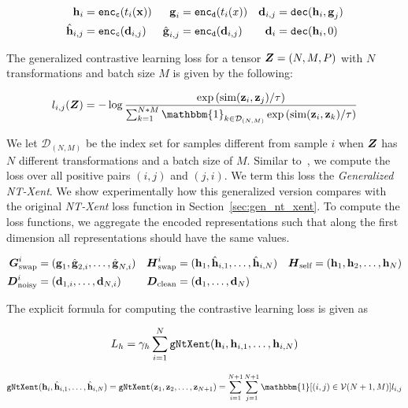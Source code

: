 \documentclass[11pt]{article}
\begin{document}
\begin{align}\label{eq:repr}
  \boldsymbol{\mathrm{h}}_i &= {\tt enc_c}(t_i(\boldsymbol{\mathrm{x}})) &  \boldsymbol{\mathrm{g}}_i &= {\tt enc_d}(t_i(x)) &  \boldsymbol{\mathrm{d}}_{i,j} &= {\tt dec}(\boldsymbol{\mathrm{h}}_i,\boldsymbol{\mathrm{g}}_j)
  \\\nonumber
  \hat{\boldsymbol{\mathrm{h}}}_{i,j} &= {\tt enc_c}(\boldsymbol{\mathrm{d}}_{i,j}) & \hat{\boldsymbol{\mathrm{g}}}_{i,j} &= {\tt enc_d}(\boldsymbol{\mathrm{d}}_{i,j}) & \boldsymbol{\mathrm{d}}_i &= {\tt dec}(\boldsymbol{\mathrm{h}}_i,0)
\end{align}

The generalized contrastive learning loss for a tensor $\boldsymbol{Z} = (N,M,P)$ with $N$ transformations and batch size $M$ is given by the following:

\begin{align}
  l_{i,j}(\mZ)
  =
  -\log
  \frac{
  \exp\left(\text{sim}(\vz_i,\vz_j)/\tau\right)
  }{
  \sum^{N*M}_{k=1}\mathbbm{1}_{k \in \mathcal{D}_{(N,M)}}\exp\left(\text{sim}(\vz_i,\vz_k)/\tau\right)
  }
\end{align}

We let $\mathcal{D}_{(N,M)}$ be the index set for samples different from sample $i$ when $\boldsymbol{Z}$ has $N$ different transformations and a batch size of $M$. Similar to~\cite{chen2020simple}, we compute the loss over all positive pairs $(i,j)$ and $(j,i)$. We term this loss the \emph{Generalized NT-Xent}.  We show experimentally how this generalized version compares with the original \emph{NT-Xent} loss function in Section~\ref{sec:gen_nt_xent}. To compute the loss functions, we aggregate the encoded representations such that along the first dimension all representations should have the same values.

\begin{align}\nonumber
  \boldsymbol{G}_{\text{swap}}^i &= (\boldsymbol{\mathrm{g}}_1,\hat{\boldsymbol{\mathrm{g}}}_{2,i},\ldots,\hat{\boldsymbol{\mathrm{g}}}_{N,i})                                 &
  \boldsymbol{H}_{\text{swap}}^i &= (\boldsymbol{\mathrm{h}}_1,\hat{\boldsymbol{\mathrm{h}}}_{i,1},\ldots,\hat{\boldsymbol{\mathrm{h}}}_{i,N}) & \boldsymbol{H}_{\text{self}} &= (\boldsymbol{\mathrm{h}}_1,\boldsymbol{\mathrm{h}}_2,\ldots,\boldsymbol{\mathrm{h}}_N)
   \\\nonumber                          
  \boldsymbol{D}_{\text{noisy}}^i &= (\boldsymbol{\mathrm{d}}_{1,i},\ldots,\boldsymbol{\mathrm{d}}_{N,i})
  &                     
  \boldsymbol{D}_{\text{clean}} &= (\boldsymbol{\mathrm{d}}_1,\ldots,\boldsymbol{\mathrm{d}}_N)
\end{align}

The explicit formula for computing the contrastive learning loss is given as

\[
  L_h = \gamma_h \sum_{i=1}^N {\tt gNtXent}(\boldsymbol{\mathrm{h}}_i,\boldsymbol{\mathrm{h}}_{i,1},\ldots,\boldsymbol{\mathrm{h}}_{i,N})
\]

\[
  {\tt gNtXent}(\vh_i,\hat{\vh}_{i,1},\ldots,\hat{\vh}_{i,N})
  =
  {\tt gNtXent}(\vz_1,\vz_2,\ldots,\vz_{N+1})
  =
  \sum_{i=1}^{N+1} \sum_{j=1}^{N+1} \mathbbm{1}[(i,j) \in \mathcal{V}(N+1,M)] l_{i,j}
\]
\end{document}
